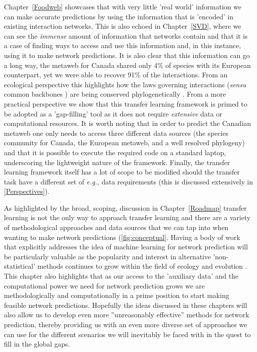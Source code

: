 Chapter~\ref{Foodweb} showcases that with very little 'real world' information we can make accurate predictions by using the information that is 'encoded' in existing interaction networks. This is also echoed in Chapter~\ref{SVD}, where we can see the \emph{immense} amount of information that networks contain and that it is a case of finding ways to access and use this information and, in this instance, using it to make network predictions. It is also clear that this information can go a long way, the metaweb for Canada shared only 4\% of species with its European counterpart, yet we were able to recover 91\% of the interactions. From an ecological perspective this highlights how the laws governing interactions (\emph{sensu} common backbones \cite{BramonMora2018IdeCom}) are being conserved phylogenetically \cite{Davies2021EcoRed, Elmasri2020HieBay, Gomez2010EcoInt}. From a more practical perspective we show that this transfer learning framework is primed to be adopted as a 'gap-filling' tool as it does not require \emph{extensive} data or computational resources. It is worth noting that in order to predict the Canadian metaweb one only needs to access three different data sources (the species community for Canada, the European metaweb, and a well resolved phylogeny) and that it is possible to execute the required code on a standard laptop, underscoring the lightweight nature of the framework. Finally, the transfer learning framework itself has a lot of scope to be modified should the transfer task have a different set of \emph{e.g.,} data requirements (this is discussed extensively in \ref{Perspectives}). 

As highlighted by the broad, scoping, discussion in Chapter~\ref{Roadmap} transfer learning is not the only way to approach transfer learning and there are a variety of methodological approaches and data sources that we can tap into when wanting to make network predictions (\autoref{fig:conceptual}. Having a body of work that explicitly addresses the idea of machine learning for network prediction will be particularly valuable as the popularity and interest in alternative 'non-statistical' methods continues to grow within the field of ecology and evolution \cite{Pichler2023Machine, Cuff2023Chapter}. This chapter also highlights that as our access to the 'auxiliary data' and the computational power we need for network prediction grows we are methodologically and computationally in a prime position to start making feasible network predictions. Hopefully the ideas discussed in these chapters will also allow us to develop even more ''unreasonably effective'' methods for network prediction, thereby providing us with an even more diverse set of approaches we can use for the different scenarios we will inevitably be faced with in the quest to fill in the global gaps.

